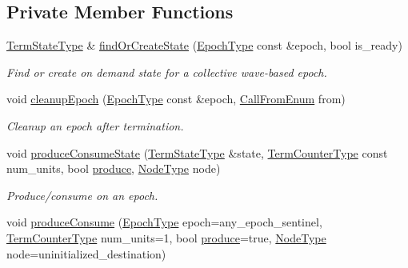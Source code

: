 \subsection*{Private Member Functions}
\begin{DoxyCompactItemize}
\item 
\hyperlink{structvt_1_1term_1_1_term_action_ae4c635b69751d887666814700ed64d65}{Term\+State\+Type} \& \hyperlink{structvt_1_1term_1_1_termination_detector_a7fae7c4264078f157ceb79df1ee5c458}{find\+Or\+Create\+State} (\hyperlink{namespacevt_a81d11b28122d43bf9834577e4a06440f}{Epoch\+Type} const \&epoch, bool is\+\_\+ready)
\begin{DoxyCompactList}\small\item\em Find or create on demand state for a collective wave-\/based epoch. \end{DoxyCompactList}\item 
void \hyperlink{structvt_1_1term_1_1_termination_detector_a40a2ebe4e220dace273cc6570dd70b01}{cleanup\+Epoch} (\hyperlink{namespacevt_a81d11b28122d43bf9834577e4a06440f}{Epoch\+Type} const \&epoch, \hyperlink{structvt_1_1term_1_1_termination_detector_a4f3ede9a87f39d86e85f92b36a6c6a30}{Call\+From\+Enum} from)
\begin{DoxyCompactList}\small\item\em Cleanup an epoch after termination. \end{DoxyCompactList}\item 
void \hyperlink{structvt_1_1term_1_1_termination_detector_a048f9a1dc93ec837a3f885ebae77ddb4}{produce\+Consume\+State} (\hyperlink{structvt_1_1term_1_1_term_action_ae4c635b69751d887666814700ed64d65}{Term\+State\+Type} \&state, \hyperlink{namespacevt_1_1term_a4fd378cdb0c36683afc1b3399d685f7f}{Term\+Counter\+Type} const num\+\_\+units, bool \hyperlink{structvt_1_1term_1_1_termination_detector_a3c31a1c36b5d55e9d28b5b26b2436573}{produce}, \hyperlink{namespacevt_a866da9d0efc19c0a1ce79e9e492f47e2}{Node\+Type} node)
\begin{DoxyCompactList}\small\item\em Produce/consume on an epoch. \end{DoxyCompactList}\item 
void \hyperlink{structvt_1_1term_1_1_termination_detector_a3e06098a7b54106910ea9000e2571a39}{produce\+Consume} (\hyperlink{namespacevt_a81d11b28122d43bf9834577e4a06440f}{Epoch\+Type} epoch=any\+\_\+epoch\+\_\+sentinel, \hyperlink{namespacevt_1_1term_a4fd378cdb0c36683afc1b3399d685f7f}{Term\+Counter\+Type} num\+\_\+units=1, bool \hyperlink{structvt_1_1term_1_1_termination_detector_a3c31a1c36b5d55e9d28b5b26b2436573}{produce}=true, \hyperlink{namespacevt_a866da9d0efc19c0a1ce79e9e492f47e2}{Node\+Type} node=uninitialized\+\_\+destination)

\end{DoxyCompactItemize}
